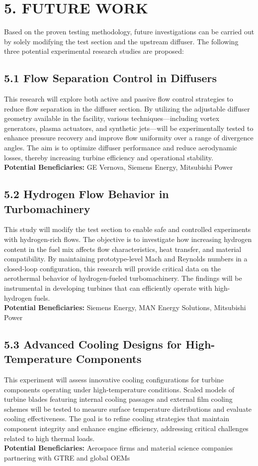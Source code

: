 \documentclass[12pt]{article}
\begin{document}
\section*{\large{5. FUTURE WORK}}
Based on the proven testing methodology, future investigations can be carried out by solely modifying the test section and the upstream diffuser. The following three potential experimental research studies are proposed:
\subsection*{5.1 Flow Separation Control in Diffusers}
This research will explore both active and passive flow control strategies to reduce flow separation in the diffuser section. By utilizing the adjustable diffuser geometry available in the facility, various techniques—including vortex generators, plasma actuators, and synthetic jets—will be experimentally tested to enhance pressure recovery and improve flow uniformity over a range of divergence angles. The aim is to optimize diffuser performance and reduce aerodynamic losses, thereby increasing turbine efficiency and operational stability.  
\\\textbf{Potential Beneficiaries:} GE Vernova, Siemens Energy, Mitsubishi Power

\subsection*{5.2 Hydrogen Flow Behavior in Turbomachinery}
This study will modify the test section to enable safe and controlled experiments with hydrogen-rich flows. The objective is to investigate how increasing hydrogen content in the fuel mix affects flow characteristics, heat transfer, and material compatibility. By maintaining prototype-level Mach and Reynolds numbers in a closed-loop configuration, this research will provide critical data on the aerothermal behavior of hydrogen-fueled turbomachinery. The findings will be instrumental in developing turbines that can efficiently operate with high-hydrogen fuels.
\\\textbf{Potential Beneficiaries:} Siemens Energy, MAN Energy Solutions, Mitsubishi Power

\subsection*{5.3 Advanced Cooling Designs for High-Temperature Components}
This experiment will assess innovative cooling configurations for turbine components operating under high-temperature conditions. Scaled models of turbine blades featuring internal cooling passages and external film cooling schemes will be tested to measure surface temperature distributions and evaluate cooling effectiveness. The goal is to refine cooling strategies that maintain component integrity and enhance engine efficiency, addressing critical challenges related to high thermal loads.
\\\textbf{Potential Beneficiaries:} Aerospace firms and material science companies partnering with GTRE and global OEMs
\end{document}
